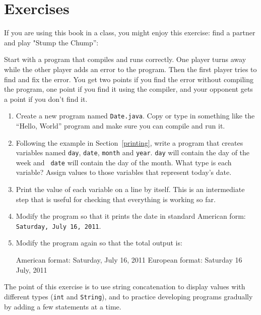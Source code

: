\section{Exercises}

\begin{exercise}

If you are using this book in a class, you might enjoy this exercise:
find a partner and play "Stump the Chump'':

Start with a program that compiles and runs correctly.  One player
turns away while the other player adds an error to the program.  Then
the first player tries to find and fix the error.  You get two points
if you find the error without compiling the program, one point if you
find it using the compiler, and your opponent gets a point if you
don't find it.

\end{exercise}


\begin{exercise}
\label{ex.date}

\begin{enumerate}

\item Create a new program named {\tt Date.java}.  Copy or
type in something like the ``Hello, World'' program and make
sure you can compile and run it.

\item Following the example in Section~\ref{printing}, write a program
that creates variables named {\tt day}, {\tt date}, {\tt month}
and {\tt year}.  {\tt day} will contain the day of the week and {\tt
date} will contain the day of the month.  What type is each variable?
Assign values to those variables that represent today's date.

\item Print the value of each variable on a line by itself.  This is
an intermediate step that is useful for checking that everything is
working so far.

\item Modify the program so that it prints the date in standard
American form: {\tt Saturday, July 16, 2011}.

\item Modify the program again so that the total output is:

\begin{verbatimtab}
American format:
Saturday, July 16, 2011
European format:
Saturday 16 July, 2011
\end{verbatimtab}

\end{enumerate}

The point of this exercise is to use string concatenation to display
values with different types ({\tt int} and {\tt String}), and to
practice developing programs gradually by adding a few statements
at a time.

\end{exercise}


